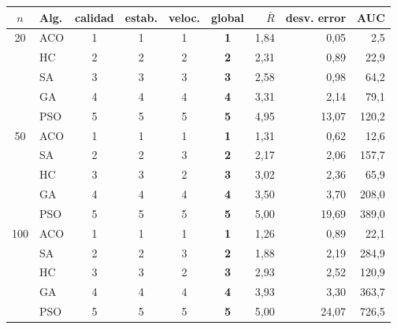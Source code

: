 \begin{tabular}{clccccrrr}
\toprule
$n$ & Alg. & calidad & estab. & veloc. & global & $\bar R$ & desv. error & AUC \\
\midrule
20 & ACO & 1 & 1 & 1 & \textbf{1} & 1{,}84 & 0{,}05 & 2{,}5 \\
 & HC & 2 & 2 & 2 & \textbf{2} & 2{,}31 & 0{,}89 & 22{,}9 \\
 & SA & 3 & 3 & 3 & \textbf{3} & 2{,}58 & 0{,}98 & 64{,}2 \\
 & GA & 4 & 4 & 4 & \textbf{4} & 3{,}31 & 2{,}14 & 79{,}1 \\
 & PSO & 5 & 5 & 5 & \textbf{5} & 4{,}95 & 13{,}07 & 120{,}2 \\
\midrule
50 & ACO & 1 & 1 & 1 & \textbf{1} & 1{,}31 & 0{,}62 & 12{,}6 \\
 & SA & 2 & 2 & 3 & \textbf{2} & 2{,}17 & 2{,}06 & 157{,}7 \\
 & HC & 3 & 3 & 2 & \textbf{3} & 3{,}02 & 2{,}36 & 65{,}9 \\
 & GA & 4 & 4 & 4 & \textbf{4} & 3{,}50 & 3{,}70 & 208{,}0 \\
 & PSO & 5 & 5 & 5 & \textbf{5} & 5{,}00 & 19{,}69 & 389{,}0 \\
\midrule
100 & ACO & 1 & 1 & 1 & \textbf{1} & 1{,}26 & 0{,}89 & 22{,}1 \\
 & SA & 2 & 2 & 3 & \textbf{2} & 1{,}88 & 2{,}19 & 284{,}9 \\
 & HC & 3 & 3 & 2 & \textbf{3} & 2{,}93 & 2{,}52 & 120{,}9 \\
 & GA & 4 & 4 & 4 & \textbf{4} & 3{,}93 & 3{,}30 & 363{,}7 \\
 & PSO & 5 & 5 & 5 & \textbf{5} & 5{,}00 & 24{,}07 & 726{,}5 \\
\bottomrule
\end{tabular}
